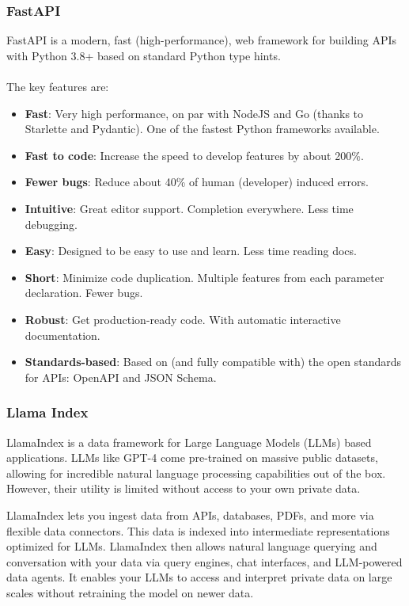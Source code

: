 \subsubsection{FastAPI}
FastAPI is a modern, fast (high-performance), web framework for building APIs with Python 3.8+ based on standard Python type hints.\cite{fastapi}\\\\
The key features are:
\begin{itemize}
  \item \textbf{Fast}: Very high performance, on par with NodeJS and Go (thanks to Starlette and Pydantic). One of the fastest Python frameworks available.
  \item \textbf{Fast to code}: Increase the speed to develop features by about 200\%. 
  \item \textbf{Fewer bugs}: Reduce about 40\% of human (developer) induced errors.
  \item \textbf{Intuitive}: Great editor support. Completion everywhere. Less time debugging.
  \item \textbf{Easy}: Designed to be easy to use and learn. Less time reading docs.
  \item \textbf{Short}: Minimize code duplication. Multiple features from each parameter declaration. Fewer bugs.
  \item \textbf{Robust}: Get production-ready code. With automatic interactive documentation.
  \item \textbf{Standards-based}: Based on (and fully compatible with) the open standards for APIs: OpenAPI and JSON Schema.
\end{itemize}
\subsubsection{Llama Index}
LlamaIndex is a data framework for Large Language Models (LLMs) based applications. LLMs like GPT-4 come pre-trained on massive public datasets, allowing for incredible natural language processing capabilities out of the box. However, their utility is limited without access to your own private data.

LlamaIndex lets you ingest data from APIs, databases, PDFs, and more via flexible data connectors. This data is indexed into intermediate representations optimized for LLMs. LlamaIndex then allows natural language querying and conversation with your data via query engines, chat interfaces, and LLM-powered data agents. It enables your LLMs to access and interpret private data on large scales without retraining the model on newer data.

